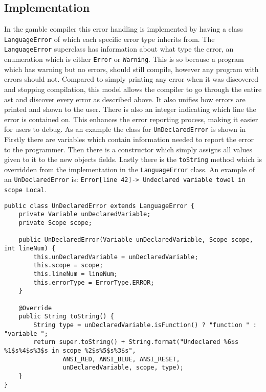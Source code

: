 \subsection*{Implementation}\label{subsec:ImplementationErrorHandling}
In the \gls{gamble} compiler this error handling is implemented by having a class \texttt{LanguageError} of which each specific error type inherits from.
The \texttt{LanguageError} superclass has information about what type the error, an enumeration which is either \texttt{Error} or \texttt{Warning}. 
This is so because a program which has warning but no errors, should still compile, however any program with errors should not. 
Compared to simply printing any error when it was discovered and stopping compilation, this model allows the compiler to go through the entire \acrshort{ast} and discover every error as described above. 
It also unifies how errors are printed and shown to the user.
There is also an integer indicating which line the error is contained on.
This enhances the error reporting process, making it easier for users to debug. 
As an example the class for \texttt{UnDeclaredError} is shown in %
Firstly there are variables which contain information needed to report the error to the programmer. 
Then there is a constructor which simply assigns all values given to it to the new objects fields.
Lastly there is the \texttt{toString} method which is overridden from the implementation in the \texttt{LanguageError} class. 
An example of an \texttt{UnDeclaredError} is: \texttt{Error[line   42]-> Undeclared variable towel in scope Local}. %

\begin{lstlisting}[caption=The UnDeclaredError class in the \gls{gamble} compiler,numbers=none,frame=tlrb,label={lst:undeclarederrorclass}]
public class UnDeclaredError extends LanguageError {
    private Variable unDeclaredVariable;
    private Scope scope;

    public UnDeclaredError(Variable unDeclaredVariable, Scope scope, int lineNum) {
        this.unDeclaredVariable = unDeclaredVariable;
        this.scope = scope;
        this.lineNum = lineNum;
        this.errorType = ErrorType.ERROR;
    }

    @Override
    public String toString() {
        String type = unDeclaredVariable.isFunction() ? "function " : "variable ";
        return super.toString() + String.format("Undeclared %6$s %1$s%4$s%3$s in scope %2$s%5$s%3$s",
                ANSI_RED, ANSI_BLUE, ANSI_RESET,
                unDeclaredVariable, scope, type);
    }
}
\end{lstlisting}

